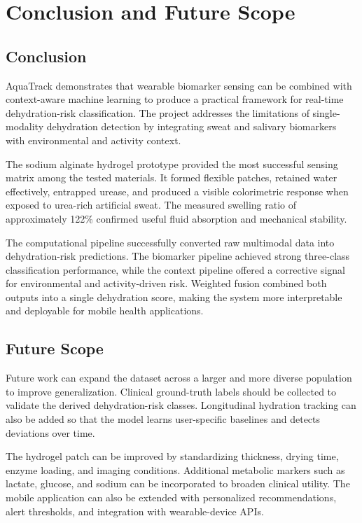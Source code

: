 \chapter{Conclusion and Future Scope}

\section{Conclusion}

AquaTrack demonstrates that wearable biomarker sensing can be combined with context-aware machine learning to produce a practical framework for real-time dehydration-risk classification. The project addresses the limitations of single-modality dehydration detection by integrating sweat and salivary biomarkers with environmental and activity context.

The sodium alginate hydrogel prototype provided the most successful sensing matrix among the tested materials. It formed flexible patches, retained water effectively, entrapped urease, and produced a visible colorimetric response when exposed to urea-rich artificial sweat. The measured swelling ratio of approximately 122\% confirmed useful fluid absorption and mechanical stability.

The computational pipeline successfully converted raw multimodal data into dehydration-risk predictions. The biomarker pipeline achieved strong three-class classification performance, while the context pipeline offered a corrective signal for environmental and activity-driven risk. Weighted fusion combined both outputs into a single dehydration score, making the system more interpretable and deployable for mobile health applications.

\section{Future Scope}

Future work can expand the dataset across a larger and more diverse population to improve generalization. Clinical ground-truth labels should be collected to validate the derived dehydration-risk classes. Longitudinal hydration tracking can also be added so that the model learns user-specific baselines and detects deviations over time.

The hydrogel patch can be improved by standardizing thickness, drying time, enzyme loading, and imaging conditions. Additional metabolic markers such as lactate, glucose, and sodium can be incorporated to broaden clinical utility. The mobile application can also be extended with personalized recommendations, alert thresholds, and integration with wearable-device APIs.

